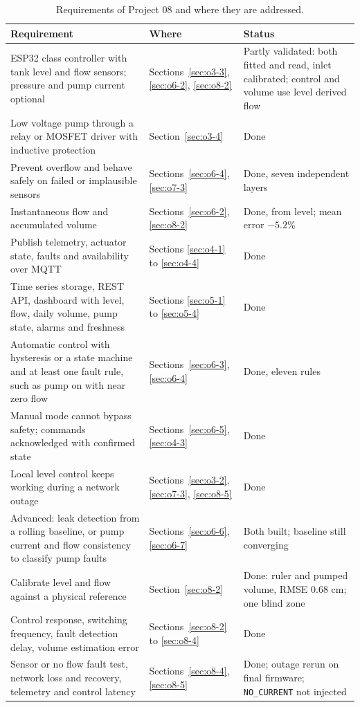 \begin{table}[H]
\caption{Requirements of Project 08 and where they are addressed.}
\label{tab:yeucau}
\centering
\renewcommand{\arraystretch}{1.1}
\small
\begin{tabular}{|>{\raggedright\arraybackslash}p{6.3cm}|>{\raggedright\arraybackslash}p{2.7cm}|>{\raggedright\arraybackslash}p{4.4cm}|}
\hline
\textbf{Requirement} & \textbf{Where} & \textbf{Status} \\
\hline
ESP32 class controller with tank level and flow sensors; pressure and pump current optional & Sections~\ref{sec:o3-3}, \ref{sec:o6-2}, \ref{sec:o8-2} & Partly validated: both fitted and read, inlet calibrated; control and volume use level derived flow \\
\hline
Low voltage pump through a relay or MOSFET driver with inductive protection & Section~\ref{sec:o3-4} & Done \\
\hline
Prevent overflow and behave safely on failed or implausible sensors & Sections~\ref{sec:o6-4}, \ref{sec:o7-3} & Done, seven independent layers \\
\hline
Instantaneous flow and accumulated volume & Sections~\ref{sec:o6-2}, \ref{sec:o8-2} & Done, from level; mean error $-5.2$\% \\
\hline
Publish telemetry, actuator state, faults and availability over MQTT & Sections \ref{sec:o4-1} to \ref{sec:o4-4} & Done \\
\hline
Time series storage, REST API, dashboard with level, flow, daily volume, pump state, alarms and freshness & Sections \ref{sec:o5-1} to \ref{sec:o5-4} & Done \\
\hline
Automatic control with hysteresis or a state machine and at least one fault rule, such as pump on with near zero flow & Sections~\ref{sec:o6-3}, \ref{sec:o6-4} & Done, eleven rules \\
\hline
Manual mode cannot bypass safety; commands acknowledged with confirmed state & Sections~\ref{sec:o6-5}, \ref{sec:o4-3} & Done \\
\hline
Local level control keeps working during a network outage & Sections~\ref{sec:o3-2}, \ref{sec:o7-3}, \ref{sec:o8-5} & Done \\
\hline
Advanced: leak detection from a rolling baseline, or pump current and flow consistency to classify pump faults & Sections~\ref{sec:o6-6}, \ref{sec:o6-7} & Both built; baseline still converging \\
\hline
Calibrate level and flow against a physical reference & Section~\ref{sec:o8-2} & Done: ruler and pumped volume, RMSE 0.68 cm; one blind zone \\
\hline
Control response, switching frequency, fault detection delay, volume estimation error & Sections~\ref{sec:o8-2} to \ref{sec:o8-4} & Done \\
\hline
Sensor or no flow fault test, network loss and recovery, telemetry and control latency & Sections~\ref{sec:o8-4}, \ref{sec:o8-5} & Done; outage rerun on final firmware; \texttt{NO\_CURRENT} not injected \\
\hline
\end{tabular}
\end{table}

